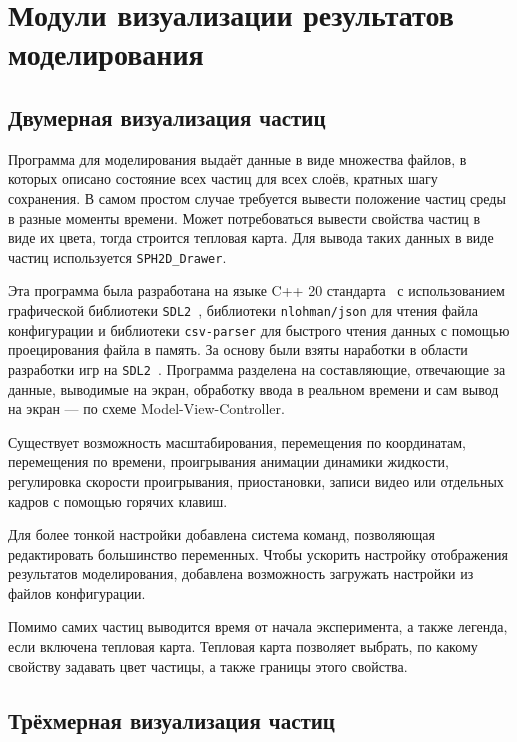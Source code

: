 \section{Модули визуализации результатов моделирования}

\subsection{Двумерная визуализация частиц}

Программа для моделирования выдаёт данные в виде множества файлов, 
в которых описано состояние всех частиц для всех слоёв, кратных шагу сохранения.
%
В самом простом случае требуется вывести положение частиц среды в разные моменты времени. 
%
Может потребоваться вывести свойства частиц в виде их цвета, тогда строится тепловая карта.
%
Для вывода таких данных в виде частиц используется \verb|SPH2D_Drawer|.

Эта программа была разработана на языке C++ 20 стандарта~\cite{Gregoire2021} 
с использованием графической библиотеки \verb|SDL2|~\cite{Mitchell2013}, 
библиотеки \verb|nlohman/json| для чтения файла конфигурации и 
библиотеки \verb|csv-parser| для быстрого чтения данных с помощью проецирования файла в память.
%
За основу были взяты наработки в области разработки игр на \verb|SDL2|~\cite{Mitchell2013}. 
Программа разделена на составляющие, отвечающие за данные, выводимые на экран, 
обработку ввода в реальном времени и сам вывод на экран --- по схеме Model-View-Controller.

Существует возможность масштабирования, перемещения по координатам, перемещения по времени, проигрывания анимации динамики жидкости, 
регулировка скорости проигрывания, приостановки, записи видео или отдельных кадров с помощью горячих клавиш.

Для более тонкой настройки добавлена система команд, позволяющая редактировать большинство переменных.
%
Чтобы ускорить настройку отображения результатов моделирования, добавлена возможность загружать настройки из файлов конфигурации.

Помимо самих частиц выводится время от начала эксперимента, а также легенда, если включена тепловая карта.
%
Тепловая карта позволяет выбрать, по какому свойству задавать цвет частицы, а также границы этого свойства.

\subsection{Трёхмерная визуализация частиц}

